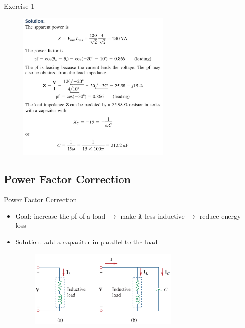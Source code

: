 \documentclass{beamer}
\begin{document}
\begin{frame}{Exercise 1}
\begin{figure}
\centering
\includegraphics[width=3in]{img_ch11/s1.jpg}
\end{figure}  
\end{frame}

\subsection{Power Factor Correction}

\begin{frame}{Power Factor Correction}
\begin{itemize}
    \item Goal: increase the pf of a load $\rightarrow$ make it less inductive $\rightarrow$ reduce energy loss

    \item Solution: add a capacitor in parallel to the load

    \begin{figure}
        \centering
        \includegraphics[width=0.7\textwidth]{img_ch11/add capacitor.png}
    \end{figure}
    
\end{itemize}

\end{frame}
\end{document}
